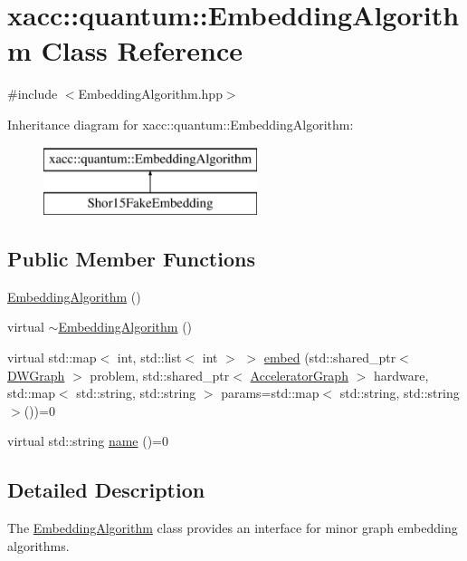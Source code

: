 \hypertarget{a01189}{}\section{xacc\+:\+:quantum\+:\+:Embedding\+Algorithm Class Reference}
\label{a01189}


{\ttfamily \#include $<$Embedding\+Algorithm.\+hpp$>$}

Inheritance diagram for xacc\+:\+:quantum\+:\+:Embedding\+Algorithm\+:\begin{figure}[H]
\begin{center}
\leavevmode
\includegraphics[height=2.000000cm]{a01189}
\end{center}
\end{figure}
\subsection*{Public Member Functions}
\begin{DoxyCompactItemize}
\item 
\hyperlink{a01189_abad06507eef6b63af0884e3a96145c69}{Embedding\+Algorithm} ()
\item 
virtual \hyperlink{a01189_aa43660ad5d4c4b3ac67863892c33dc51}{$\sim$\+Embedding\+Algorithm} ()
\item 
virtual std\+::map$<$ int, std\+::list$<$ int $>$ $>$ \hyperlink{a01189_a6fca277e217884ff79802770189276fe}{embed} (std\+::shared\+\_\+ptr$<$ \hyperlink{a01201}{D\+W\+Graph} $>$ problem, std\+::shared\+\_\+ptr$<$ \hyperlink{a01713}{Accelerator\+Graph} $>$ hardware, std\+::map$<$ std\+::string, std\+::string $>$ params=std\+::map$<$ std\+::string, std\+::string $>$())=0
\item 
virtual std\+::string \hyperlink{a01189_a21079dc8ee37792977f5fd209e3f3b19}{name} ()=0
\end{DoxyCompactItemize}


\subsection{Detailed Description}
The \hyperlink{a01189}{Embedding\+Algorithm} class provides an interface for minor graph embedding algorithms. 


